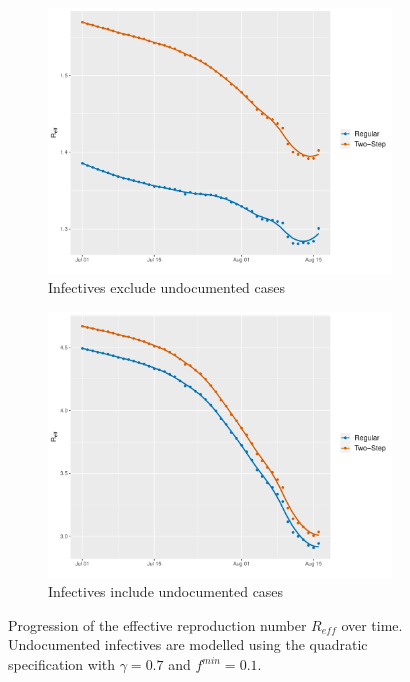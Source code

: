 \documentclass[12pt]{article}
\begin{document}
\begin{appendices}
		\begin{figure}[H]
    	    \centering
    	    \begin{subfigure}{0.495\textwidth}
    	      \centering
    	      \includegraphics[width=\linewidth]{output/panel_data_lag14_Reff_rolling.pdf}
    	      \caption{Infectives exclude undocumented cases}
    	      \label{fig:Reff_over_time_panel_data}
    	    \end{subfigure}
    	    \begin{subfigure}{0.495\textwidth}
    	      \centering
    	      \includegraphics[width=\linewidth]{output/panel_data_lag14_Reff_UndocQuadratic_rolling.pdf}
    	      \caption{Infectives include undocumented cases}
    	      \label{fig:Reff_over_time_panel_data_undoc_rolling}
    	    \end{subfigure}
    	    \caption{Progression of the effective reproduction number $R_{eff}$ over time. Undocumented infectives are modelled using the quadratic specification with $\gamma = 0.7$ and $f^{min}=0.1$.}
    	    \label{fig:Reff_over_time_panel_data_all}
    	\end{figure}
		

\end{appendices}
\end{document}
